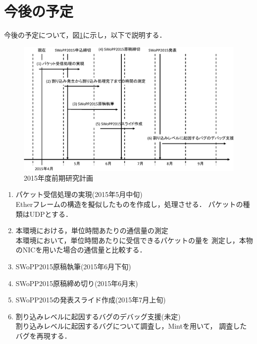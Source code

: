 \documentclass[12pt]{jsarticle}
\newcommand{\insertfigurecontents}[5][1]{
  \texttt{[image: \\figdir/\#3.\\figext]}
  \caption{#4}\ecaption{#5}\label{#2}
}
\newcommand{\insertwidefigure}[5][0.9]{
  \begin{figure}[tb]
    \begin{center}
      \insertfigurecontents[#1]{#2}{#3}{#4}{#5}
    \end{center}
  \end{figure}
}
\begin{document}
\section{今後の予定}
今後の予定について，図\ref{fig:plan}に示し，以下で説明する．
\begin{figure}[t]
    \begin{center}
    \includegraphics[clip,scale=0.65]{fig/fig1.pdf}
    \caption{2015年度前期研究計画}
    \label{fig:plan}
\end{center}
\end{figure}
\begin{enumerate}
    \item パケット受信処理の実現(2015年5月中旬)\\
        Etherフレームの構造を擬似したものを作成し，処理させる．
        パケットの種類はUDPとする．
    \item 本環境における，単位時間あたりの通信量の測定\\
        本環境において，単位時間あたりに受信できるパケットの量を
        測定し，本物のNICを用いた場合の通信量と比較する．
    \item SWoPP2015原稿執筆(2015年6月下旬)
    \item SWoPP2015原稿締め切り(2015年6月末)
    \item SWoPP2015の発表スライド作成(2015年7月上旬)
    \item 割り込みレベルに起因するバグのデバッグ支援(未定)\\
        割り込みレベルに起因するバグについて調査し，Mintを用いて，
        調査したバグを再現する．
\end{enumerate}
\end{document}
